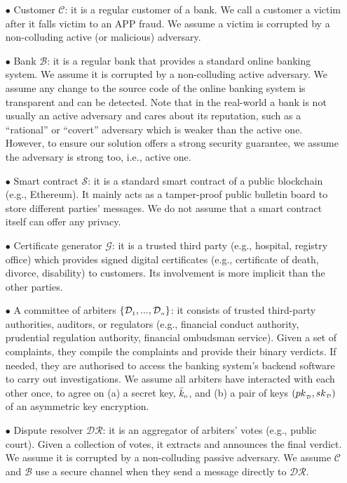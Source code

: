\begin{itemize}
%
\item[$\bullet$] Customer $\mathcal{C}$: it is a regular customer of a bank. We call a customer  a victim after it falls victim to an APP fraud. We assume a victim is corrupted by a non-colluding active (or malicious) adversary. %
%
\item[$\bullet$] Bank $\mathcal{B}$: it is a regular bank that provides a standard online banking system. We assume it is corrupted by a non-colluding active adversary. We assume  any change to the source code of the online banking system is transparent and  can be detected. Note that in the real-world a bank is  not usually an active adversary and cares about its reputation, such as a ``rational'' or ``covert'' adversary which is weaker than the active one. However, to ensure our solution offers  a strong security guarantee, we assume the adversary is strong too, i.e., active one. 

%
\item[$\bullet$] Smart contract $\mathcal{S}$: it is a standard  smart contract of a public  blockchain (e.g., Ethereum). It mainly acts as a tamper-proof public bulletin board to store different parties' messages.  We do not assume that a smart contract itself can offer any privacy. 
%
\item[$\bullet$] Certificate generator $\mathcal{G}$: it is a trusted third party (e.g., hospital, registry office) which provides signed digital certificates (e.g., certificate of death, divorce, disability) to customers. Its involvement is more implicit than the other  parties.
%
\item[$\bullet$]  A committee of arbiters $\{\mathcal{D}_{\scriptscriptstyle 1},..., \mathcal{D}_{\scriptscriptstyle n}\}$: it consists of  trusted third-party authorities, auditors, or regulators (e.g.,  financial conduct authority, prudential regulation authority, financial ombudsman service). Given a set of complaints, they compile the complaints    and provide  their binary verdicts. If needed, they are authorised to access the banking  system's backend software to carry out investigations. We assume all arbiters have interacted with each other once,  to agree on (a) a secret key, $\bar k_{\scriptscriptstyle 0}$, and (b) a pair of keys $({pk}_{\scriptscriptstyle\mathcal {D}}, {sk}_{\scriptscriptstyle\mathcal {D}})$  of an asymmetric key encryption.
%
\item[$\bullet$]  Dispute resolver $\mathcal{DR}$: it is an aggregator of arbiters' votes (e.g., public court). Given a collection of votes, it extracts and announces the final verdict. We assume it is corrupted by a non-colluding passive adversary. We assume $\mathcal C$ and $\mathcal B$  use a secure channel when they  send a message directly to $\mathcal{DR}$. 
%
\end{itemize}




